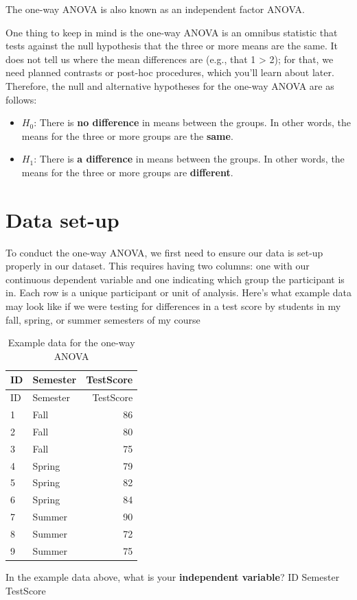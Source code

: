 \documentclass[
]{book}
\providecommand{\tightlist}{%
  \setlength{\itemsep}{0pt}\setlength{\parskip}{0pt}}
\begin{document}
The one-way ANOVA is also known as an independent factor ANOVA.

One thing to keep in mind is the one-way ANOVA is an omnibus statistic that tests against the null hypothesis that the three or more means are the same. It does not tell us where the mean differences are (e.g., that 1 \textgreater{} 2); for that, we need planned contrasts or post-hoc procedures, which you'll learn about later. Therefore, the null and alternative hypotheses for the one-way ANOVA are as follows:

\begin{itemize}
\tightlist
\item
  \(H_0\): There is \textbf{no difference} in means between the groups. In other words, the means for the three or more groups are the \textbf{same}.
\item
  \(H_1\): There is \textbf{a difference} in means between the groups. In other words, the means for the three or more groups are \textbf{different}.
\end{itemize}

\hypertarget{data-set-up-5}{%
\section{Data set-up}\label{data-set-up-5}}

To conduct the one-way ANOVA, we first need to ensure our data is set-up properly in our dataset. This requires having two columns: one with our continuous dependent variable and one indicating which group the participant is in. Each row is a unique participant or unit of analysis. Here's what example data may look like if we were testing for differences in a test score by students in my fall, spring, or summer semesters of my course

\begin{longtable}[]{@{}llr@{}}
\caption{Example data for the one-way ANOVA}\tabularnewline
\toprule
ID & Semester & TestScore\tabularnewline
\midrule
\endfirsthead
\toprule
ID & Semester & TestScore\tabularnewline
\midrule
\endhead
1 & Fall & 86\tabularnewline
2 & Fall & 80\tabularnewline
3 & Fall & 75\tabularnewline
4 & Spring & 79\tabularnewline
5 & Spring & 82\tabularnewline
6 & Spring & 84\tabularnewline
7 & Summer & 90\tabularnewline
8 & Summer & 72\tabularnewline
9 & Summer & 75\tabularnewline
\bottomrule
\end{longtable}

In the example data above, what is your \textbf{independent variable}? ID Semester TestScore
\end{document}

